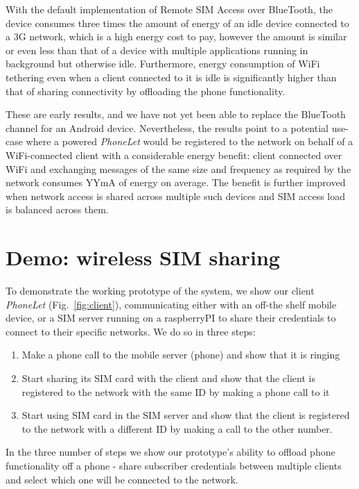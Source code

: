 \documentclass{sig-alternate-10pt}
\begin{document}
With the default implementation of Remote SIM Access over BlueTooth, the device consumes three times the amount of energy of an idle device connected to a 3G network, which is a high energy cost to pay, however the amount is similar or even less than that of a device with multiple applications running in background but otherwise idle. Furthermore, energy consumption of WiFi tethering even when a client connected to it is idle is significantly higher than that of sharing connectivity by offloading the phone functionality. 

These are early results, and we have not yet been able to replace the BlueTooth channel for an Android device. Nevertheless, the results point to a potential use-case where a powered \emph{PhoneLet} would be registered to the network on behalf of a WiFi-connected client with a considerable energy benefit: client connected over WiFi and exchanging messages of the same size and frequency as required by the network consumes YYmA of energy on average. The benefit is further improved when network access is shared across multiple such devices and SIM access load is balanced across them.

\section{Demo: wireless SIM sharing}

To demonstrate the working prototype of the system, we show our client \emph{PhoneLet} (Fig.~\ref{fig:client}), communicating either with an off-the shelf mobile device, or a SIM server running on a raspberryPI to share their
credentials to connect to their specific networks. We do so in three steps:

\begin{enumerate}
    \item Make a phone call to the mobile server (phone) and show that it is ringing
    \item Start sharing its SIM card with the client and show that the client is registered to the network with the same ID by making a phone call to it
    \item Start using SIM card in the SIM server and show that the client is registered to the network with a different ID by making a call to the other number.
\end{enumerate}

In the three number of steps we show our prototype's ability to offload phone functionality off a phone - share subscriber credentials between multiple clients and select which one will be connected to the network.
\end{document}
